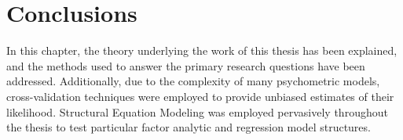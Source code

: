 \section{Conclusions}
\label{sec:conclusions}


In this chapter, the theory underlying the work of this thesis has been explained, and the methods used to answer the primary research questions have been addressed. Additionally, due to the complexity of many psychometric models, cross-validation techniques were employed to provide unbiased estimates of their likelihood. %
Structural Equation Modeling was employed pervasively throughout the thesis to test particular factor analytic and regression model structures.










